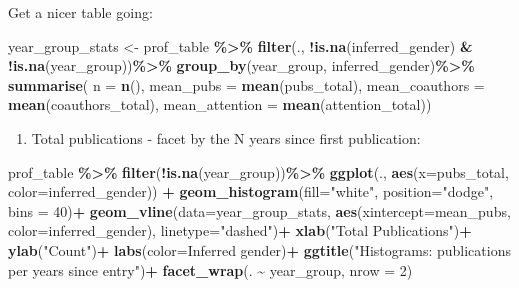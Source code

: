 \documentclass[
]{article}
\newenvironment{Shaded}{\begin{snugshade}}{\end{snugshade}}
\newcommand{\AttributeTok}[1]{\textcolor[rgb]{0.13,0.29,0.53}{#1}}
\newcommand{\DecValTok}[1]{\textcolor[rgb]{0.00,0.00,0.81}{#1}}
\newcommand{\FunctionTok}[1]{\textcolor[rgb]{0.13,0.29,0.53}{\textbf{#1}}}
\newcommand{\NormalTok}[1]{#1}
\newcommand{\OtherTok}[1]{\textcolor[rgb]{0.56,0.35,0.01}{#1}}
\newcommand{\SpecialCharTok}[1]{\textcolor[rgb]{0.81,0.36,0.00}{\textbf{#1}}}
\newcommand{\StringTok}[1]{\textcolor[rgb]{0.31,0.60,0.02}{#1}}
\providecommand{\tightlist}{%
  \setlength{\itemsep}{0pt}\setlength{\parskip}{0pt}}
\begin{document}
Get a nicer table going:

\begin{Shaded}
\begin{Highlighting}[]
\NormalTok{year\_group\_stats }\OtherTok{\textless{}{-}}\NormalTok{ prof\_table }\SpecialCharTok{\%\textgreater{}\%}
  \FunctionTok{filter}\NormalTok{(., }\SpecialCharTok{!}\FunctionTok{is.na}\NormalTok{(inferred\_gender) }\SpecialCharTok{\&} \SpecialCharTok{!}\FunctionTok{is.na}\NormalTok{(year\_group))}\SpecialCharTok{\%\textgreater{}\%}
  \FunctionTok{group\_by}\NormalTok{(year\_group, inferred\_gender)}\SpecialCharTok{\%\textgreater{}\%}
  \FunctionTok{summarise}\NormalTok{(}
    \AttributeTok{n =} \FunctionTok{n}\NormalTok{(),}
    \AttributeTok{mean\_pubs =} \FunctionTok{mean}\NormalTok{(pubs\_total),}
    \AttributeTok{mean\_coauthors =} \FunctionTok{mean}\NormalTok{(coauthors\_total),}
    \AttributeTok{mean\_attention =} \FunctionTok{mean}\NormalTok{(attention\_total))}
\end{Highlighting}
\end{Shaded}

\begin{enumerate}
\def\labelenumi{\arabic{enumi}.}
\tightlist
\item
  Total publications - facet by the N years since first publication:
\end{enumerate}

\begin{Shaded}
\begin{Highlighting}[]
\NormalTok{prof\_table }\SpecialCharTok{\%\textgreater{}\%}
  \FunctionTok{filter}\NormalTok{(}\SpecialCharTok{!}\FunctionTok{is.na}\NormalTok{(year\_group))}\SpecialCharTok{\%\textgreater{}\%}
\FunctionTok{ggplot}\NormalTok{(., }\FunctionTok{aes}\NormalTok{(}\AttributeTok{x=}\NormalTok{pubs\_total, }\AttributeTok{color=}\NormalTok{inferred\_gender)) }\SpecialCharTok{+}
  \FunctionTok{geom\_histogram}\NormalTok{(}\AttributeTok{fill=}\StringTok{"white"}\NormalTok{, }\AttributeTok{position=}\StringTok{"dodge"}\NormalTok{, }\AttributeTok{bins =} \DecValTok{40}\NormalTok{)}\SpecialCharTok{+}
  \FunctionTok{geom\_vline}\NormalTok{(}\AttributeTok{data=}\NormalTok{year\_group\_stats, }\FunctionTok{aes}\NormalTok{(}\AttributeTok{xintercept=}\NormalTok{mean\_pubs, }\AttributeTok{color=}\NormalTok{inferred\_gender),}
             \AttributeTok{linetype=}\StringTok{"dashed"}\NormalTok{)}\SpecialCharTok{+}
  \FunctionTok{xlab}\NormalTok{(}\StringTok{"Total Publications"}\NormalTok{)}\SpecialCharTok{+}
  \FunctionTok{ylab}\NormalTok{(}\StringTok{"Count"}\NormalTok{)}\SpecialCharTok{+}
  \FunctionTok{labs}\NormalTok{(}\AttributeTok{color=}\StringTok{\textquotesingle{}Inferred gender\textquotesingle{}}\NormalTok{)}\SpecialCharTok{+}
  \FunctionTok{ggtitle}\NormalTok{(}\StringTok{"Histograms: publications per years since entry"}\NormalTok{)}\SpecialCharTok{+}
  \FunctionTok{facet\_wrap}\NormalTok{(. }\SpecialCharTok{\textasciitilde{}}\NormalTok{ year\_group, }\AttributeTok{nrow =} \DecValTok{2}\NormalTok{)}
\end{Highlighting}
\end{Shaded}
\end{document}
